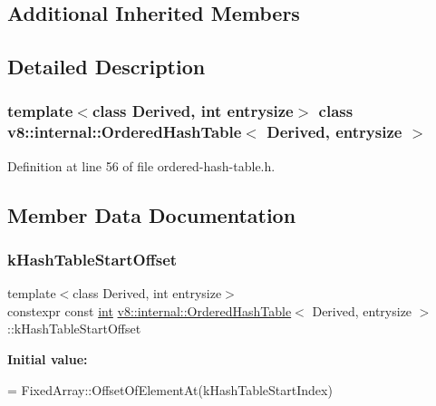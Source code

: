 \subsection*{Additional Inherited Members}


\subsection{Detailed Description}
\subsubsection*{template$<$class Derived, int entrysize$>$\newline
class v8\+::internal\+::\+Ordered\+Hash\+Table$<$ Derived, entrysize $>$}



Definition at line 56 of file ordered-\/hash-\/table.\+h.



\subsection{Member Data Documentation}
\mbox{\label{classv8_1_1internal_1_1OrderedHashTable_ad242e53f66535fa70ee30745434dc647}} 
\subsubsection{\texorpdfstring{k\+Hash\+Table\+Start\+Offset}{kHashTableStartOffset}}
{\footnotesize\ttfamily template$<$class Derived, int entrysize$>$ \\
constexpr const \mbox{\hyperlink{classint}{int}} \mbox{\hyperlink{classv8_1_1internal_1_1OrderedHashTable}{v8\+::internal\+::\+Ordered\+Hash\+Table}}$<$ Derived, entrysize $>$\+::k\+Hash\+Table\+Start\+Offset\hspace{0.3cm}{\ttfamily [static]}}

{\bfseries Initial value\+:}
\begin{DoxyCode}
=
      FixedArray::OffsetOfElementAt(kHashTableStartIndex)
\end{DoxyCode}



